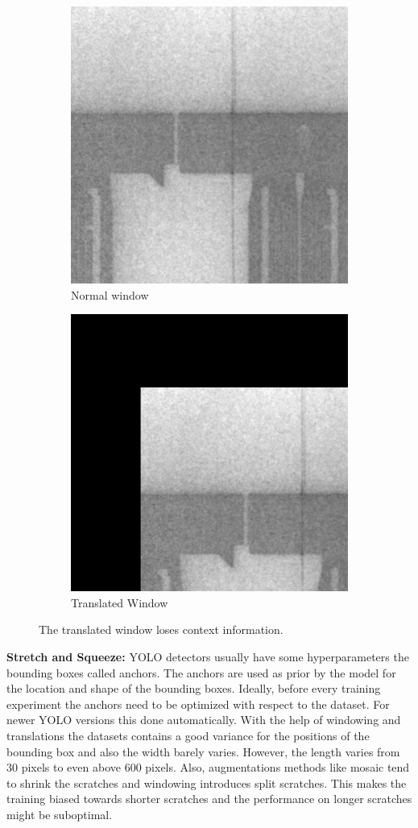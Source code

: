 \begin{figure}[!h]
\centering
\begin{subfigure}{.5\textwidth}
  \centering
  \includegraphics[width=.4\linewidth]{images/implementation/augmentations/window_no_translation}
  \caption{Normal window}
\end{subfigure}%
\begin{subfigure}{.5\textwidth}
  \centering
  \includegraphics[width=.4\linewidth]{images/implementation/augmentations/window_translation}
  \caption{Translated Window}
\end{subfigure}
\caption{The translated window loses context information.}
\label{TODO}
\end{figure}



\textbf{Stretch and Squeeze:}
YOLO detectors usually have some hyperparameters the bounding boxes called anchors. The anchors are used as prior by the model for the location and shape of the bounding boxes. Ideally, before every training experiment the anchors need to be optimized with respect to the dataset. For newer YOLO versions this done automatically. With the help of windowing and translations the datasets contains a good variance for the positions of the bounding box and also the width barely varies. However, the length varies from 30 pixels to even above 600 pixels. Also, augmentations methods like mosaic tend to shrink the scratches and windowing introduces split scratches. This makes the training biased towards shorter scratches and the performance on longer scratches might be suboptimal. \\

